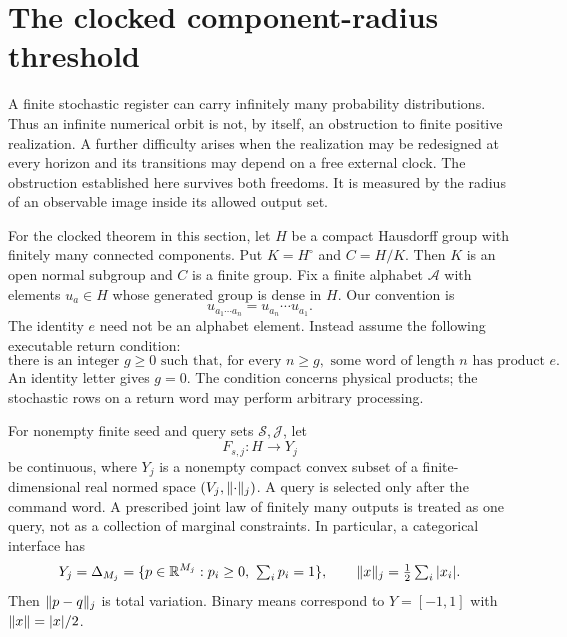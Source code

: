 \section{The clocked component-radius threshold}\label{sec:intro54}
A finite stochastic register can carry infinitely many probability distributions. Thus an infinite numerical orbit is not, by itself, an obstruction to finite positive realization. A further difficulty arises when the realization may be redesigned at every horizon and its transitions may depend on a free external clock. The obstruction established here survives both freedoms. It is measured by the radius of an observable image inside its allowed output set.

For the clocked theorem in this section, let $H$ be a compact Hausdorff group with finitely many connected components. Put $K=H^\circ$ and $C=H/K$. Then $K$ is an open normal subgroup and $C$ is a finite group. Fix a finite alphabet $\mathcal A$ with elements $u_a\in H$ whose generated group is dense in $H$. Our convention is
\[
 u_{a_1\cdots a_n}=u_{a_n}\cdots u_{a_1}.
\]
The identity $e$ need not be an alphabet element. Instead assume the following executable return condition:
\begin{equation}\label{eq:returns54}
 \text{there is an integer }g\ge0\text{ such that, for every }n\ge g,
 \text{ some word of length }n\text{ has product }e.
\end{equation}
An identity letter gives $g=0$. The condition concerns physical products; the stochastic rows on a return word may perform arbitrary processing.

For nonempty finite seed and query sets $\mathcal S,\mathcal J$, let
\[
 F_{s,j}:H\longrightarrow Y_j
\]
be continuous, where $Y_j$ is a nonempty compact convex subset of a finite-dimensional real normed space $(V_j,\lVert \cdot\rVert_j)$. A query is selected only after the command word. A prescribed joint law of finitely many outputs is treated as one query, not as a collection of marginal constraints. In particular, a categorical interface has
\[
 Y_j=\Delta_{M_j}=\{p\in\R^{M_j}:p_i\ge0,\ \textstyle\sum_i p_i=1\},
 \qquad \norm{x}_j=\tfrac12\sum_i|x_i|.
\]
Then $\lVert p-q\rVert_j$ is total variation. Binary means correspond to $Y=[-1,1]$ with $\lVert x\rVert=|x|/2$.

